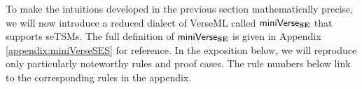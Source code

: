 
To make the intuitions developed in the previous section mathematically precise, we will now introduce a reduced dialect of VerseML called $\mathsf{miniVerse}_\textbf{SE}$ that supports seTSMs. 
The full definition of $\mathsf{miniVerse}_\textbf{SE}$ is given in Appendix \ref{appendix:miniVerseSES} for reference. In the exposition below, we will reproduce only particularly noteworthy rules and proof cases. The rule numbers below link to the corresponding rules in the appendix.

